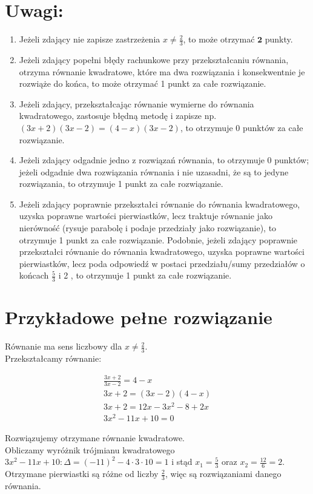 \documentclass[10pt]{article}
\begin{document}
\section*{Uwagi:}
\begin{enumerate}
  \item Jeżeli zdający nie zapisze zastrzeżenia $x \neq \frac{2}{3}$, to może otrzymać $\mathbf{2}$ punkty.
  \item Jeżeli zdający popełni błędy rachunkowe przy przekształcaniu równania, otrzyma równanie kwadratowe, które ma dwa rozwiązania i konsekwentnie je rozwiąże do końca, to może otrzymać 1 punkt za całe rozwiązanie.
  \item Jeżeli zdający, przekształcając równanie wymierne do równania kwadratowego, zastosuje błędną metodę i zapisze np. $(3 x+2)(3 x-2)=(4-x)(3 x-2)$, to otrzymuje 0 punktów za całe rozwiązanie.
  \item Jeżeli zdający odgadnie jedno z rozwiązań równania, to otrzymuje 0 punktów; jeżeli odgadnie dwa rozwiązania równania i nie uzasadni, że są to jedyne rozwiązania, to otrzymuje 1 punkt za całe rozwiązanie.
  \item Jeżeli zdający poprawnie przekształci równanie do równania kwadratowego, uzyska poprawne wartości pierwiastków, lecz traktuje równanie jako nierówność (rysuje parabolę i podaje przedziały jako rozwiązanie), to otrzymuje 1 punkt za całe rozwiązanie. Podobnie, jeżeli zdający poprawnie przekształci równanie do równania kwadratowego, uzyska poprawne wartości pierwiastków, lecz poda odpowiedź w postaci przedziału/sumy przedziałów o końcach $\frac{5}{3}$ i 2 , to otrzymuje 1 punkt za całe rozwiązanie.
\end{enumerate}

\section*{Przykładowe pełne rozwiązanie}
Równanie ma sens liczbowy dla $x \neq \frac{2}{3}$.\\
Przekształcamy równanie:

$$
\begin{gathered}
\frac{3 x+2}{3 x-2}=4-x \\
3 x+2=(3 x-2)(4-x) \\
3 x+2=12 x-3 x^{2}-8+2 x \\
3 x^{2}-11 x+10=0
\end{gathered}
$$

Rozwiązujemy otrzymane równanie kwadratowe.\\
Obliczamy wyróżnik trójmianu kwadratowego $3 x^{2}-11 x+10: \Delta=(-11)^{2}-4 \cdot 3 \cdot 10=1$ i stąd $x_{1}=\frac{5}{3}$ oraz $x_{2}=\frac{12}{6}=2$.\\
Otrzymane pierwiastki są różne od liczby $\frac{2}{3}$, więc są rozwiązaniami danego równania.
\end{document}
